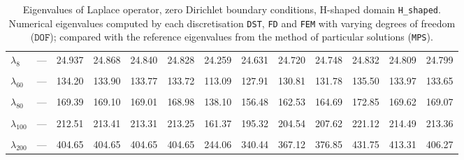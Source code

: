 \begin{table}[htbp]
{{\begin{tabular}{lrrrrrrrrrrrr}
    $\lambda_{8}$ & --- & 24.937 & 24.868 & 24.840 & 24.828 & 24.259 & 24.631 & 24.720 & 24.748 & 24.832 & 24.809 & 24.799 \\
    & & & & & & & & & & & & \\
    $\lambda_{60}$ & --- & 134.20 & 133.90 & 133.77 & 133.72 & 113.09 & 127.91 & 130.81 & 131.78 & 135.50 & 133.97 & 133.65 \\
    & & & & & & & & & & & & \\
    $\lambda_{80}$ & --- & 169.39 & 169.10 & 169.01 & 168.98 & 138.10 & 156.48 & 162.53 & 164.69 & 172.85 & 169.62 & 169.07 \\
    & & & & & & & & & & & & \\
    $\lambda_{100}$ & --- & 212.51 & 213.41 & 213.31 & 213.25 & 161.37 & 195.32 & 204.54 & 207.62 & 221.12 & 214.49 & 213.36 \\
    & & & & & & & & & & & & \\
    $\lambda_{200}$ & --- & 404.65 & 404.65 & 404.65 & 404.65 & 244.06 & 340.44 & 367.12 & 376.85 & 431.75 & 413.31 & 406.27 \\
    \bottomrule
  \end{tabular}}}
  \caption{Eigenvalues of Laplace operator, zero Dirichlet boundary conditions, H-shaped domain \texttt{H\_shaped}. Numerical eigenvalues computed by each discretisation \texttt{DST}, \texttt{FD} and \texttt{FEM} with varying degrees of freedom ($\mathtt{DOF}$); compared with the reference eigenvalues from the method of particular solutions (\texttt{MPS}).}
  \label{tab:eigenvalues_head_H_shaped_transposed_extended}
\end{table}
